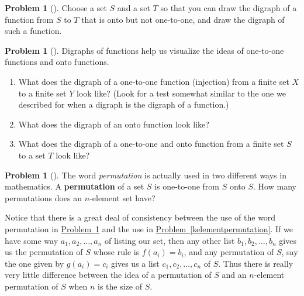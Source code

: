 \documentclass[10pt,]{book}
\newcommand{\terminology}[1]{\textbf{#1}}
\theoremstyle{plain}
\theoremstyle{definition}
\newtheorem{activity}[project]{Problem}
\theoremstyle{definition}
\numberwithin{equation}{chapter}
\begin{document}
\begin{activity}[] \label{activity-25}
Choose a set \(S\) and a set \(T\) so that you can draw the digraph of a function from \(S\) to \(T\) that is onto but not one-to-one, and draw the digraph of such a function.%
\end{activity}
\begin{activity}[] \label{activity-26}
Digraphs of functions help us visualize the ideas of one-to-one functions and onto functions.%
\begin{enumerate}[font=\bfseries,label=(\alph*),ref=\alph*]
\item\label{task-18} \marginsymbol[-2.5em]{} What does the digraph of a one-to-one function (injection) from a finite set \(X\) to a finite set \(Y\) look like? (Look for a test somewhat similar to the one we described for when a digraph is the digraph of a function.)%
\item\label{task-19} \marginsymbol[-2.5em]{} What does the digraph of an onto function look like?%
\item\label{bijectiondigraph} \marginsymbol[-2.5em]{} What does the digraph of a one-to-one and onto function from a finite set \(S\) to a set \(T\) look like?%
\end{enumerate}
\end{activity}
\begin{activity}[] \label{permutationasbijection}
The word \emph{permutation} is actually used in two different ways in mathematics. A \terminology{permutation} of a set \(S\) is one-to-one from \(S\) onto \(S\). How many permutations does an \(n\)-element set have?%
\end{activity}
Notice that there is a great deal of consistency between the use of the word permutation in \hyperref[permutationasbijection]{Problem~\ref{permutationasbijection}} and the use in \hyperref[kelementpermutation]{Problem~\ref{kelementpermutation}}. If we have some way \(a_1,a_2,\ldots,a_n\) of listing our set, then any other list \(b_1,b_2,\ldots,b_n\) gives us the permutation of \(S\) whose rule is \(f(a_i) =b_i\), and any permutation of \(S\), say the one given by \(g(a_i)=c_i\) gives us a list \(c_1,c_2,\ldots,c_n\) of \(S\). Thus there is really very little difference between the idea of a permutation of \(S\) and an \(n\)-element permutation of \(S\) when \(n\) is the size of \(S\).%
\typeout{************************************************}
\typeout{************************************************}
\end{document}
